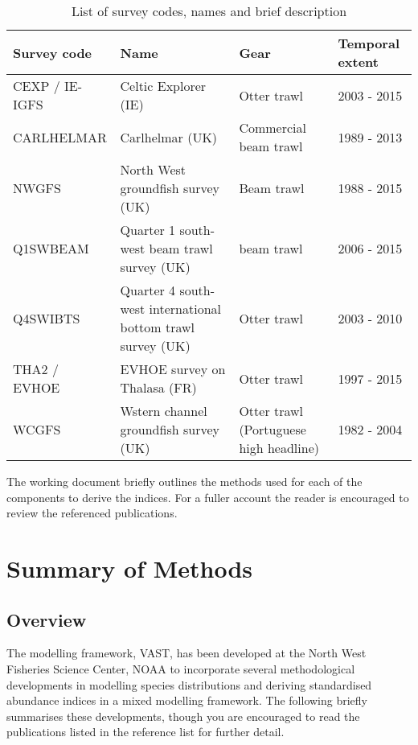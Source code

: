 \documentclass[11pt]{article}
\begin{document}
\begin{table}[!htb]
	\caption{List of survey codes, names and brief description}
	\label{tab:2}
	\center
	\begin{tabular}{ p{3cm} p{4cm} p{4cm} p{2cm} }
		\hline
		Survey code    & Name 	& Gear & Temporal extent \\
		\hline
		CEXP / IE-IGFS & Celtic Explorer (IE)   & Otter trawl & 2003 - 2015 \\
		CARLHELMAR     & Carlhelmar (UK)	& Commercial beam trawl & 1989 - 2013 \\
		NWGFS          & North West groundfish survey (UK) & Beam trawl & 1988 - 2015 \\
		Q1SWBEAM       & Quarter 1 south-west beam trawl survey (UK) 	& beam trawl & 2006 - 2015 \\
		Q4SWIBTS       & Quarter 4 south-west international bottom trawl survey (UK) & Otter trawl & 2003 - 2010 \\
		THA2 / EVHOE    & EVHOE survey on Thalasa (FR) & Otter trawl & 1997 - 2015 \\
		WCGFS          & Wstern channel groundfish survey (UK) & Otter
		trawl (Portuguese high headline) & 1982 - 2004 \\
		\hline
	\end{tabular}
\end{table}

The working document briefly outlines the methods used for each of the
components to derive the indices. For a fuller account the reader is encouraged
to review the referenced publications.

\section{Summary of Methods}

\subsection{Overview}

The modelling framework, VAST, has been developed at the North West Fisheries
Science Center, NOAA to incorporate several methodological developments in
modelling species distributions and deriving standardised abundance indices in
a mixed modelling framework. The following briefly summarises these
developments, though you are encouraged to read the publications listed in the
reference list for further detail. \\ 
\end{document}
